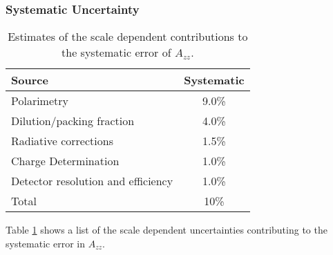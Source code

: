 \subsubsection{Systematic Uncertainty}%
\begin{table}
\begin{center}
\begin{tabular}{l|c}\hline\hline
Source                         & Systematic \\
\hline
Polarimetry                  &   9.0\%   \\
Dilution/packing fraction    &   4.0\%   \\
Radiative corrections        &   1.5\%   \\
Charge Determination           &  1.0\%  \\
Detector resolution and efficiency & 1.0\% \\
\hline
Total  &  10\%   \\
\hline
\end{tabular}
\caption{\label{error1}Estimates of the scale dependent contributions to the systematic error of $A_{zz}$.}
\end{center}
\end{table}



Table \ref{error1} shows a list of the scale dependent uncertainties contributing to the systematic error in $A_{zz}$.

